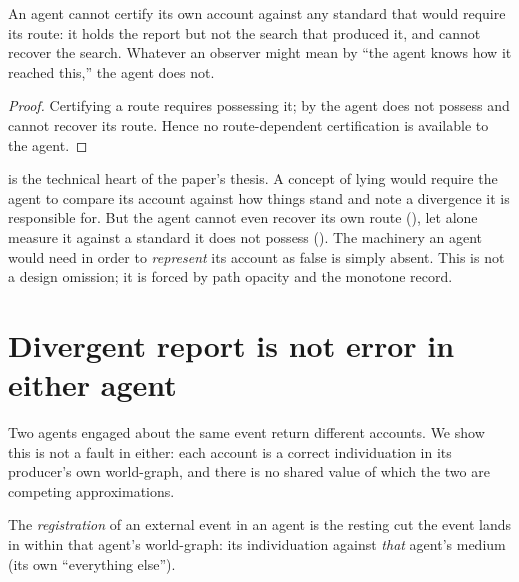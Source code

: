 \documentclass[11pt,twocolumn,a4paper]{article}
\begin{document}
\begin{corollary}
\label{cor:nocertify}
An agent cannot certify its own account against any standard that would
require its route: it holds the report but not the search that produced it,
and cannot recover the search. Whatever an observer might mean by ``the
agent knows how it reached this,'' the agent does not.
\end{corollary}

\begin{proof}
Certifying a route requires possessing it; by  the
agent does not possess and cannot recover its route. Hence no
route-dependent certification is available to the agent.
\end{proof}

\begin{remark}
\label{rem:crux}
 is the technical heart of the paper's thesis. A concept
of lying would require the agent to compare its account against how things
stand and note a divergence it is responsible for. But the agent cannot even
recover its own route (), let alone measure it
against a standard it does not possess (). The machinery an
agent would need in order to \emph{represent} its account as false is simply
absent. This is not a design omission; it is forced by path opacity and the
monotone record.
\end{remark}

\section{Divergent report is not error in either agent}
\label{sec:divergence}

Two agents engaged about the same event return different accounts. We show
this is not a fault in either: each account is a correct individuation in
its producer's own world-graph, and there is no shared value of which the
two are competing approximations.

\begin{definition}[Registration]
\label{def:registration}
The \emph{registration} of an external event in an agent is the resting cut
the event lands in within that agent's world-graph: its individuation
against \emph{that} agent's medium (its own ``everything else'').
\end{definition}
\end{document}
